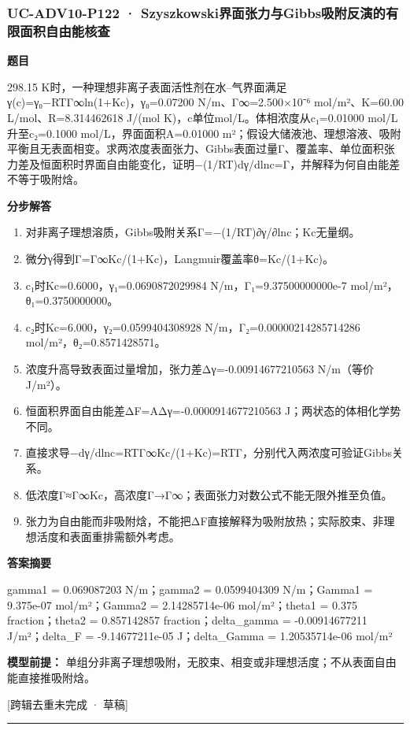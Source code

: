 \documentclass[UTF8,11pt,a4paper]{ctexart}
\begin{document}
\subsubsection*{UC-ADV10-P122 · Szyszkowski界面张力与Gibbs吸附反演的有限面积自由能核查}
\noindent\textbf{题目}\par
298.15 K时，一种理想非离子表面活性剂在水–气界面满足γ(c)=γ₀−RTΓ∞ln(1+Kc)，γ₀=0.07200 N/m、Γ∞=2.500×10⁻⁶ mol/m²、K=60.00 L/mol、R=8.314462618 J/(mol K)，c单位mol/L。体相浓度从c₁=0.01000 mol/L升至c₂=0.1000 mol/L，界面面积A=0.01000 m²；假设大储液池、理想溶液、吸附平衡且无表面相变。求两浓度表面张力、Gibbs表面过量Γ、覆盖率、单位面积张力差及恒面积时界面自由能变化，证明−(1/RT)dγ/dlnc=Γ，并解释为何自由能差不等于吸附焓。\par
\medskip\noindent\textbf{分步解答}
\begin{enumerate}
\item 对非离子理想溶质，Gibbs吸附关系Γ=−(1/RT)∂γ/∂lnc；Kc无量纲。
\item 微分γ得到Γ=Γ∞Kc/(1+Kc)，Langmuir覆盖率θ=Kc/(1+Kc)。
\item c₁时Kc=0.6000，γ₁=0.0690872029984 N/m，Γ₁=9.37500000000e-7 mol/m²，θ₁=0.3750000000。
\item c₂时Kc=6.000，γ₂=0.0599404308928 N/m，Γ₂=0.00000214285714286 mol/m²，θ₂=0.8571428571。
\item 浓度升高导致表面过量增加，张力差Δγ=-0.00914677210563 N/m（等价J/m²）。
\item 恒面积界面自由能差ΔF=AΔγ=-0.0000914677210563 J；两状态的体相化学势不同。
\item 直接求导−dγ/dlnc=RTΓ∞Kc/(1+Kc)=RTΓ，分别代入两浓度可验证Gibbs关系。
\item 低浓度Γ≈Γ∞Kc，高浓度Γ→Γ∞；表面张力对数公式不能无限外推至负值。
\item 张力为自由能而非吸附焓，不能把ΔF直接解释为吸附放热；实际胶束、非理想活度和表面重排需额外考虑。
\end{enumerate}
\noindent\textbf{答案摘要}\par
gamma1 = 0.069087203 N/m；gamma2 = 0.0599404309 N/m；Gamma1 = 9.375e-07 mol/m²；Gamma2 = 2.14285714e-06 mol/m²；theta1 = 0.375 fraction；theta2 = 0.857142857 fraction；delta\_gamma = -0.00914677211 J/m²；delta\_F = -9.14677211e-05 J；delta\_Gamma = 1.20535714e-06 mol/m²\par
\noindent\textbf{模型前提：}
单组分非离子理想吸附，无胶束、相变或非理想活度；不从表面自由能直接推吸附焓。\par
\noindent\textcolor{red!65!black}{[跨辑去重未完成 · 草稿]} \par
\medskip\hrule\medskip
\end{document}
